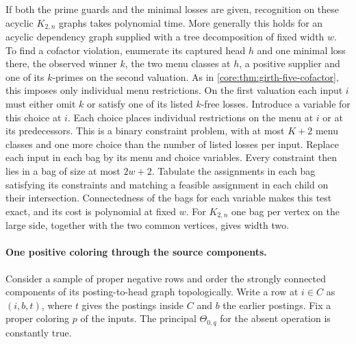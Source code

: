 If both the prime guards and the minimal losses are given, recognition
on these acyclic $K_{2,n}$ graphs takes polynomial time. More generally
this holds for an acyclic dependency graph supplied with a tree
decomposition of fixed width $w$. To find a cofactor violation,
enumerate its captured head $h$ and one minimal loss there, the observed
winner $k$, the two menu classes at $h$, a positive supplier and one
of its $k$-primes on the second valuation. As in
\cref{core:thm:girth-five-cofactor}, this imposes only individual menu
restrictions. On the first valuation each input $i$ must either omit
$k$ or satisfy one of its listed $k$-free losses. Introduce a variable
for this choice at $i$. Each choice places individual restrictions
on the menu at $i$ or at its predecessors. This is a binary constraint
problem, with at most $K+2$ menu classes and one more choice than
the number of listed losses per input. Replace each input in each
bag by its menu and choice variables. Every constraint then lies in
a bag of size at most $2w+2$. Tabulate the assignments in each bag
satisfying its constraints and matching a feasible assignment in each
child on their intersection. Connectedness of the bags for each variable
makes this test exact, and its cost is polynomial at fixed $w$.
For $K_{2,n}$ one bag per vertex on the large side, together with
the two common vertices, gives width two.

\paragraph{One positive coloring through the source components.}
Consider a sample of proper negative rows and order the strongly
connected components of its posting-to-head graph topologically. Write
a row at $i\in C$ as $(i,b,t)$, where $t$ gives the postings inside
$C$ and $b$ the earlier postings. Fix a proper coloring $p$ of the
inputs. The principal $\Theta_{0,q}$ for the absent operation is
constantly true.

